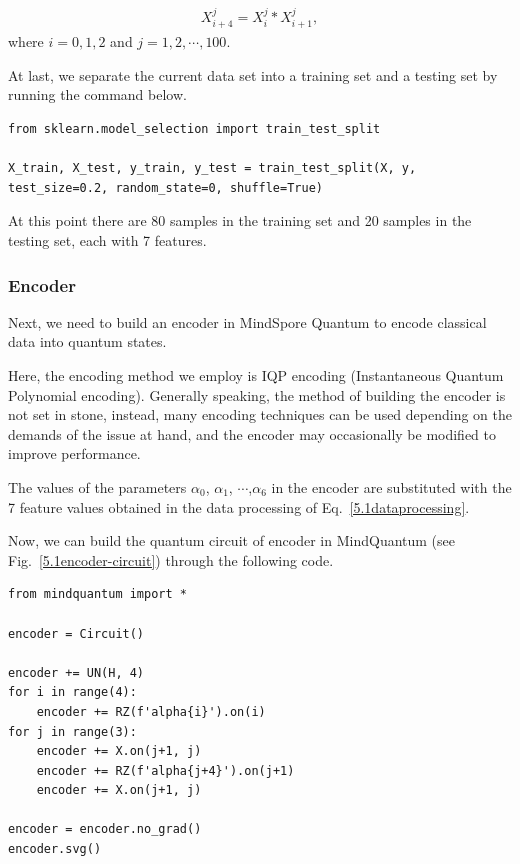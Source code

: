 \begin{eqnarray}\label{5.1dataprocessing}
X_{i+4}^{j} = X_{i}^{j} * X_{i+1}^{j},
\end{eqnarray}
where $i = 0, 1, 2$ and $j = 1, 2, \cdots, 100$. 

At last, we separate the current data set into a training set and a testing set by running the command below.

\begin{lstlisting}
from sklearn.model_selection import train_test_split                                                   

X_train, X_test, y_train, y_test = train_test_split(X, y, test_size=0.2, random_state=0, shuffle=True)  
\end{lstlisting}

At this point there are 80 samples in the training set and 20 samples in the testing set, each with 7 features.

\subsubsection{Encoder}
Next, we need to build an encoder in MindSpore Quantum to encode classical data into quantum states.

Here, the encoding method we employ is IQP encoding (Instantaneous Quantum Polynomial encoding). Generally speaking, the method of building the encoder is not set in stone, instead, many encoding techniques can be used depending on the demands of the issue at hand, and the encoder may occasionally be modified to improve performance.

The values of the parameters $\alpha_0$, $\alpha_1$, $\cdots$,$\alpha_6$ in the encoder are substituted with the 7 feature values obtained in the data processing of Eq.~\eqref{5.1dataprocessing}.

Now, we can build the quantum circuit of encoder in MindQuantum (see Fig.~\ref{5.1encoder-circuit}) through the following code.

\begin{lstlisting}
from mindquantum import *   
        
encoder = Circuit()  

encoder += UN(H, 4)                                  
for i in range(4):                                   
    encoder += RZ(f'alpha{i}').on(i)                
for j in range(3):                                   
    encoder += X.on(j+1, j)                         
    encoder += RZ(f'alpha{j+4}').on(j+1)             
    encoder += X.on(j+1, j)                         

encoder = encoder.no_grad()                          
encoder.svg()
\end{lstlisting}


